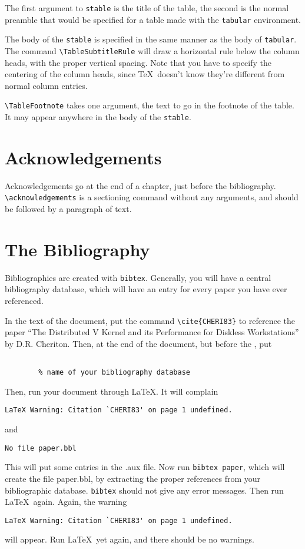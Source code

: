 The first argument to \verb|stable| is the title of the table,
the second is the normal preamble that would be specified for a table
made with the \verb|tabular| environment.

The body of the \verb|stable| is specified in the same manner as
the body of \verb|tabular|.  The command \verb|\TableSubtitleRule|
will draw a horizontal rule below the column heads, with the proper
vertical spacing.  Note that you have to specify the centering of the
column heads, since \TeX\ doesn't know they're different from normal
column entries.

\verb|\TableFootnote| takes one argument, the text to go in the footnote
of the table.  It may appear anywhere in the body of the \verb|stable|.

\section{Acknowledgements}
Acknowledgements go at the end of a chapter, just before the bibliography.
\verb|\acknowledgements| is a sectioning command without any arguments,
and should be followed by a paragraph of text.

\section{The Bibliography}
\label{bibl}

Bibliographies are created with \verb|bibtex|.
Generally, you will have a central bibliography database,
which will have an entry for every paper you have ever referenced.

In the text of the document, put the command
\verb|\cite{CHERI83}| to reference the paper ``The Distributed V Kernel
and its Performance for Diskless Workstations'' by D.R. Cheriton.
Then, at the end of the document, but before the
\verb||, put
\begin{verbatim}

		% name of your bibliography database
\end{verbatim}

Then, run your document through \LaTeX.  It will complain
\begin{verbatim}
LaTeX Warning: Citation `CHERI83' on page 1 undefined.
\end{verbatim}
and
\begin{verbatim}
No file paper.bbl
\end{verbatim}

This will put some entries in the .aux file.  Now run \verb|bibtex paper|,
which will create the file paper.bbl, by extracting the proper
references from your bibliographic database.  \verb|bibtex| should not
give any error messages.
Then run \LaTeX\ again. Again, the warning
\begin{verbatim}
LaTeX Warning: Citation `CHERI83' on page 1 undefined.
\end{verbatim}
will appear.  Run \LaTeX\ yet again, and there should be no warnings.

